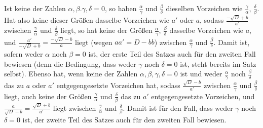 Ist keine der Zahlen $\alpha,\beta.\gamma,\delta=0$, so haben $\frac{\alpha}{\gamma}$ und $\frac{\beta}{\delta}$ dieselben Vorzeichen wie $\frac{\gamma}{\alpha}$, $\frac{\delta}{\beta}$. Hat also keine dieser Größen dasselbe Vorzeichen wie $a'$ oder $a$, sodass $\frac{-\surd D+b}{a'}$ zwischen $\frac{\gamma}{\alpha}$ und $\frac{\delta}{\beta}$ liegt, so hat keine der Größen $\frac{\alpha}{\gamma}$, $\frac{\beta}{\delta}$ dasselbe Vorzeichen wie $a$, und $\frac{a'}{-\surd D+b}=\frac{-\surd D-b}{a}$ liegt (wegen $aa'=D-bb$) zwischen $\frac{\alpha}{\gamma}$ und $\frac{\beta}{\delta}$. Damit ist, sofern weder $\alpha$ noch $\beta=0$ ist, der erste Teil des Satzes auch für den zweiten Fall bewiesen (denn die Bedingung, dass weder $\gamma$ noch $\delta=0$ ist, steht bereits im Satz selbst). Ebenso hat, wenn keine der Zahlen $\alpha,\beta,\gamma,\delta=0$ ist
und weder $\frac{\alpha}{\gamma}$ noch $\frac{\beta}{\delta}$ das zu $a$ oder $a'$ entgegengesetzte Vorzeichen hat, sodass ${\frac{\surd D-b}{a'}}$ zwischen $\frac{\alpha}{\gamma}$ und $\frac{\beta}{\delta}$ liegt, auch keine der Größen $\frac{\gamma}{\alpha}$ und $\frac{\delta}{\beta}$ das zu $a'$ entgegengesetzte Vorzeichen, und $\frac{a}{\surd D-b}=\frac{\surd D+b}{a'}$ liegt zwischen $\frac{\gamma}{\alpha}$ und $\frac{\delta}{\beta}$. Damit ist für den Fall, dass weder $\gamma$ noch $\delta=0$ ist, der zweite Teil des Satzes auch für den zweiten Fall bewiesen.

